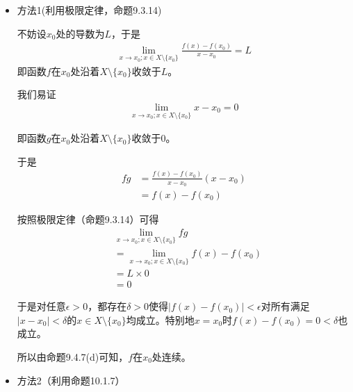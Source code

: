 \documentclass{article}
\begin{document}
\begin{itemize}
  \item 方法1(利用极限定律，命题9.3.14)

        不妨设$x_0$处的导数为$L$，于是
        \begin{align*}
          \lim\limits_{x \to x_0; x \in X \setminus \{x_0\}} \frac{f(x) - f(x_0)}{x - x_0} = L
        \end{align*}
        即函数$f$在$x_0$处沿着$X \setminus \{x_0\}$收敛于$L$。

        我们易证
        \begin{align*}
          \lim\limits_{x \to x_0; x \in X \setminus \{x_0\}} x - x_0 = 0
        \end{align*}

        即函数$g$在$x_0$处沿着$X \setminus \{x_0\}$收敛于$0$。

        于是
        \begin{align*}
          fg & = \frac{f(x) - f(x_0)}{x - x_0}  (x - x_0) \\
             & = f(x) - f(x_0)
        \end{align*}

        按照极限定律（命题9.3.14）可得
        \begin{align*}
           & \lim\limits_{x \to x_0; x \in X \setminus \{x_0\}} fg              \\
           & = \lim\limits_{x \to x_0; x \in X \setminus \{x_0\}} f(x) - f(x_0) \\
           & = L \times 0                                                       \\
           & = 0
        \end{align*}

        于是对任意$\epsilon > 0$，都存在$\delta > 0$使得$|f(x) - f(x_0)| < \epsilon$对所有满足
        $|x - x_0| < \delta$的$x \in X \setminus \{x_0\}$均成立。特别地$x = x_0$时$f(x) - f(x_0) = 0 < \delta$也成立。

        所以由命题9.4.7(d)可知，$f$在$x_0$处连续。



  \item 方法2（利用命题10.1.7）


\end{itemize}
\end{document}

